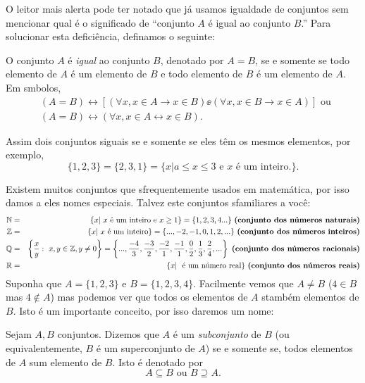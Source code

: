O leitor mais alerta pode ter notado que j\'a usamos igualdade de conjuntos sem mencionar qual \'e o significado de ``conjunto $A$ \'e igual ao conjunto $B$.'' Para solucionar esta defici\^encia, definamos o seguinte:

\begin{definb}
O conjunto $A$ \'e {\it igual} ao conjunto $B$, denotado por $A=B$, se e somente se todo elemento de $A$ \'e um elemento de $B$ e todo elemento de $B$ \'e um elemento de $A$. Em s\ih mbolos,
\begin{eqnarray*}
&(A=B)\leftrightarrow [(\forall x, x\in A \to x\in B)\ee(\forall x, x\in B \to x\in A)] \textrm{ ou } \\
&(A=B)\leftrightarrow (\forall x, x\in A \leftrightarrow x\in B).
\end{eqnarray*}
\end{definb}
 
Assim dois conjuntos s\ao iguais se e somente se eles t\^em os mesmos elementos, por exemplo,
\[
\{1,2,3\}=\{2,3,1\}=\{x|a\leq x\leq 3 \textrm{ e $x$ \'e um inteiro.}\}.
\]

Existem muitos conjuntos que s\ao frequentemente usados em matem\'atica, por isso damos a eles nomes especiais. Talvez este conjuntos s\ao familiares a voc\^e:
\begin{eqnarray*}
\mathbb{N}&=&\{x|\textrm{ } x \textrm{ \'e um inteiro e $x\geq 1$}\}=\{1,2,3,4...\} \textrm{ {\bf (conjunto dos n\'umeros naturais)}}\\
\mathbb{Z}&=&\{x|\textrm{ } x \textrm{ \'e um inteiro}\}=\{...,-2,-1,0,1,2,...\} \textrm{ {\bf (conjunto dos n\'umeros inteiros)}}\\
\mathbb{Q}&=&\left\{\dfrac{x}{y}: \textrm{ } x,y\in\mathbb{Z},y\neq 0\right\}=\left\{...,\dfrac{-4}{3},\dfrac{-3}{2},\dfrac{-2}{1},\dfrac{-1}{1},\dfrac{0}{2},\dfrac{1}{3},\dfrac{2}{4},...\right\} \textrm{ {\bf (conjunto dos n\'umeros racionais)}}\\
\mathbb{R}&=&\{x|\textrm{ } \textrm{ \'e um n\'umero real}\} \textrm{ {\bf (conjunto dos n\'umeros reais)}}
\end{eqnarray*}
Suponha que $A=\{1,2,3\}$ e $B=\{1,2,3,4\}$. Facilmente vemos que $A\neq B$ ($4\in B$ mas $4\notin A$) mas podemos ver que todos os elementos de $A$ s\ao tamb\'em elementos de $B$. Isto \'e um importante conceito, por isso daremos um nome:

\begin{definb}
Sejam $A,B$ conjuntos. Dizemos que $A$ \'e um {\it subconjunto}  de $B$ (ou equivalentemente, $B$ \'e um superconjunto de $A$) se e somente se, todos elementos de $A$ s\ao um elemento de $B$. Isto \'e denotado por
\[
A \subseteq B \textrm{ ou } B \supseteq A. 
\]
\end{definb}

